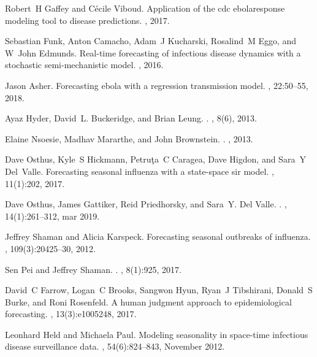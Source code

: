 \documentclass[a4paper]{article}
\begin{document}
\begin{thebibliography}{100}
Robert~H Gaffey and C{\'e}cile Viboud.
\newblock Application of the cdc ebolaresponse modeling tool to disease
  predictions.
, 2017.

Sebastian Funk, Anton Camacho, Adam~J Kucharski, Rosalind~M Eggo, and W~John
  Edmunds.
\newblock Real-time forecasting of infectious disease dynamics with a
  stochastic semi-mechanistic model.
, 2016.

Jason Asher.
\newblock Forecasting ebola with a regression transmission model.
, 22:50--55, 2018.

Ayaz Hyder, David~L. Buckeridge, and Brian Leung.
.
, 8(6), 2013.

Elaine Nsoesie, Madhav Mararthe, and John Brownstein.
.
, 2013.

Dave Osthus, Kyle~S Hickmann, Petru{\c{t}}a~C Caragea, Dave Higdon, and Sara~Y
  Del~Valle.
\newblock Forecasting seasonal influenza with a state-space sir model.
, 11(1):202, 2017.

Dave Osthus, James Gattiker, Reid Priedhorsky, and Sara~Y. {Del Valle}.
.
, 14(1):261--312, mar 2019.

Jeffrey Shaman and Alicia Karspeck.
\newblock Forecasting seasonal outbreaks of influenza.
, 109(3):20425--30, 2012.

Sen Pei and Jeffrey Shaman.
.
, 8(1):925, 2017.

David~C Farrow, Logan~C Brooks, Sangwon Hyun, Ryan~J Tibshirani, Donald~S
  Burke, and Roni Rosenfeld.
\newblock A human judgment approach to epidemiological forecasting.
, 13(3):e1005248, 2017.

Leonhard Held and Michaela Paul.
\newblock Modeling seasonality in space-time infectious disease surveillance
  data.
, 54(6):824--843, November 2012.


\end{thebibliography}
\end{document}
